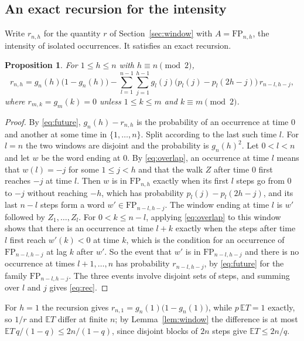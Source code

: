 \documentclass[11pt]{amsart}
\newtheorem{proposition}[theorem]{Proposition}
\theoremstyle{remark}
\numberwithin{equation}{section}
\newcommand{\EE}{\mathbb{E}}
\newcommand{\FP}{\mathrm{FP}}
\begin{document}
\subsection*{An exact recursion for the intensity}
Write $r_{n,h}$ for the quantity $r$ of Section~\ref{sec:window} with $A=\FP_{n,h}$, the intensity of isolated occurrences. It satisfies an exact recursion.

\begin{proposition}\label{prop:rec}
For $1\le h\le n$ with $h\equiv n\pmod2$,
\begin{equation}\label{eq:rec}
r_{n,h}=g_n(h)\bigl(1-g_n(h)\bigr)-\sum_{l=1}^{n-1}\sum_{j=1}^{h-1}g_l(j)\bigl(p_l(j)-p_l(2h-j)\bigr)\,r_{n-l,h-j},
\end{equation}
where $r_{m,k}=g_m(k)=0$ unless $1\le k\le m$ and $k\equiv m\pmod2$.
\end{proposition}

\begin{proof}
By \eqref{eq:future}, $g_n(h)-r_{n,h}$ is the probability of an occurrence at time $0$ and another at some time in $\{1,\dots,n\}$. Split according to the last such time $l$. For $l=n$ the two windows are disjoint and the probability is $g_n(h)^2$. Let $0<l<n$ and let $w$ be the word ending at $0$. By \eqref{eq:overlap}, an occurrence at time $l$ means that $w(l)=-j$ for some $1\le j<h$ and that the walk $Z$ after time $0$ first reaches $-j$ at time $l$. Then $w$ is in $\FP_{n,h}$ exactly when its first $l$ steps go from $0$ to $-j$ without reaching $-h$, which has probability $p_l(j)-p_l(2h-j)$, and its last $n-l$ steps form a word $w'\in\FP_{n-l,h-j}$. The window ending at time $l$ is $w'$ followed by $Z_1,\dots,Z_l$. For $0<k\le n-l$, applying \eqref{eq:overlap} to this window shows that there is an occurrence at time $l+k$ exactly when the steps after time $l$ first reach $w'(k)<0$ at time $k$, which is the condition for an occurrence of $\FP_{n-l,h-j}$ at lag $k$ after $w'$. So the event that $w'$ is in $\FP_{n-l,h-j}$ and there is no occurrence at times $l+1,\dots,n$ has probability $r_{n-l,h-j}$, by \eqref{eq:future} for the family $\FP_{n-l,h-j}$. The three events involve disjoint sets of steps, and summing over $l$ and $j$ gives \eqref{eq:rec}.
\end{proof}

For $h=1$ the recursion gives $r_{n,1}=g_n(1)\bigl(1-g_n(1)\bigr)$, while $p\,\EE T=1$ exactly, so $1/r$ and $\EE T$ differ at finite $n$; by Lemma~\ref{lem:window} the difference is at most $\EE T\,q/(1-q)\le2n/(1-q)$, since disjoint blocks of $2n$ steps give $\EE T\le2n/q$.
\end{document}
